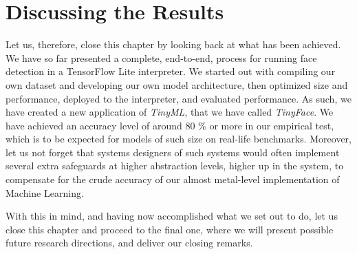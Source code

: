 \section{Discussing the Results}
Let us, therefore, close this chapter by looking back at what has been achieved. We have so far presented a complete, end-to-end, process for running face detection in a TensorFlow Lite interpreter. We started out with compiling our own dataset and developing our own model architecture, then optimized size and performance, deployed to the interpreter, and evaluated performance. As such, we have created a new application of \textit{TinyML}, that we have called \textit{TinyFace}. We have achieved an accuracy level of around 80 \% or more in our empirical test, which is to be expected for models of such size on real-life benchmarks. Moreover, let us not forget that systems designers of such systems would often implement several extra safeguards at higher abstraction levels, higher up in the system, to compensate for the crude accuracy of our almost metal-level implementation of Machine Learning. \par
With this in mind, and having now accomplished what we set out to do, let us close this chapter and proceed to the final one, where we will present possible future research directions, and deliver our closing remarks.